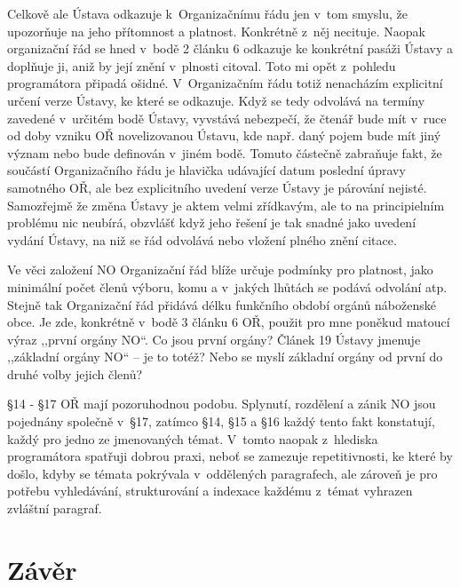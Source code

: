 Celkově ale Ústava odkazuje k~Organizačnímu řádu jen v~tom smyslu, že upozorňuje
na jeho přítomnost a platnost. Konkrétně z~něj necituje. Naopak organizační řád
se hned v~bodě 2 článku 6 odkazuje ke konkrétní pasáži Ústavy a doplňuje ji,
aniž by její znění v~plnosti citoval. Toto mi opět z~pohledu programátora
připadá ošidné. V~Organizačním řádu totiž nenacházím explicitní určení verze
Ústavy, ke které se odkazuje. Když se tedy odvolává na termíny zavedené
v~určitém bodě Ústavy, vyvstává nebezpečí, že čtenář bude mít v~ruce od doby
vzniku OŘ novelizovanou Ústavu, kde např. daný pojem bude mít jiný význam nebo
bude definován v~jiném bodě. Tomuto částečně zabraňuje fakt, že součástí
Organizačního řádu je hlavička udávající datum poslední úpravy samotného OŘ, ale
bez explicitního uvedení verze Ústavy je párování nejisté. Samozřejmě že změna
Ústavy je aktem velmi zřídkavým, ale to na principielním problému nic neubírá,
obzvlášť když jeho řešení je tak snadné jako uvedení vydání Ústavy, na niž se
řád odvolává nebo vložení plného znění citace.

Ve věci založení NO Organizační řád blíže určuje podmínky pro platnost, jako
minimální počet členů výboru, komu a v~jakých lhůtách se podává odvolání atp.
Stejně tak Organizační řád přidává délku funkčního období orgánů náboženské
obce. Je zde, konkrétně v~bodě 3 článku 6 OŘ, použit pro mne poněkud matoucí
výraz ,,první orgány NO``. Co jsou první orgány? Článek 19 Ústavy jmenuje
,,základní orgány NO`` -- je to totéž? Nebo se myslí základní orgány od první do
druhé volby jejich členů?

§14 - §17 OŘ mají pozoruhodnou podobu. Splynutí, rozdělení a zánik NO jsou
pojednány společně v~§17, zatímco §14, §15 a §16 každý tento fakt konstatují,
každý pro jedno ze jmenovaných témat. V~tomto naopak z~hlediska programátora
spatřuji dobrou praxi, neboť se zamezuje repetitivnosti, ke které by došlo,
kdyby se témata pokrývala v~oddělených paragrafech, ale zároveň je pro potřebu
vyhledávání, strukturování a indexace každému z~témat vyhrazen zvláštní
paragraf.

\chapter{Závěr}


